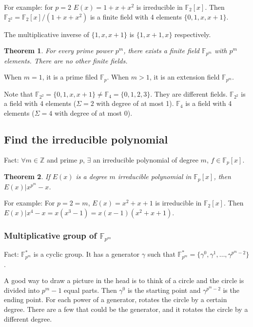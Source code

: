 \documentclass[letterpaper,12pt]{article}
\newtheorem{theorem}{Theorem}
\begin{document}
For example: for $p=2$ $E(x)=1+x+x^2$ is irreducible in $\mathbb{F}_2[x]$. Then
$\mathbb{F}_{2^2}=\mathbb{F}_2[x]/(1+x+x^2)$ is a finite field with 4 elements
$\{0,1,x,x+1\}$.

The multiplicative inverse of $\{1,x,x+1\}$ is $\{1,x+1,x\}$ respectively.

\begin{theorem}
    For every prime power $p^m$, there exists a finite field $\mathbb{F}_{p^m}$ with $p^m$ elements. There are no other finite fields.
\end{theorem}
When $m=1$, it is a prime filed $\mathbb{F}_p$. When $m>1$, it is an extension field $\mathbb{F}_{p^m}$.

Note that $\mathbb{F}_{2^2}=\{0,1,x,x+1\}\neq \mathbb{F}_4 = \{0,1,2,3\}$. They
are different fields. $\mathbb{F}_{2^2}$ is a field with 4 elements ($\Sigma =
    2$ with degree of at most 1). $\mathbb{F}_4$ is a field with 4 elements
($\Sigma = 4$ with degree of at most 0).
\subsection{Find the irreducible polynomial}
Fact: $\forall m \in \mathbb{Z}$ and prime $p$, $\exists$ an irreducible
polynomial of degree $m$, $f\in \mathbb{F}_p[x]$.
\begin{theorem}
    If $E(x)$ is a degree $m$ irreducible polynomial in $\mathbb{F}_p[x]$, then $E(x)|x^{p^m}-x$.
\end{theorem}
For example: For $p=2=m$, $E(x)=x^2+x+1$ is irreducible in $\mathbb{F}_2[x]$. Then $E(x)|x^4-x = x(x^3-1)=x(x-1)(x^2+x+1)$.

\subsubsection{Multiplicative group of $\mathbb{F}_{p^m}$}
Fact: $\mathbb{F}_{p^m}^*$ is a cyclic group. It has a generator $\gamma$ such that $\mathbb{F}_{p^m}^*=\{\gamma^0,\gamma^1,\ldots,\gamma^{p^m-2}\}$.

A good way to draw a picture in the head is to think of a circle and the circle
is divided into $p^m-1$ equal parts. Then $\gamma^0$ is the starting point and
$\gamma^{p^m-2}$ is the ending point. For each power of a generator, rotates
the circle by a certain degree. There are a few that could be the generator,
and it rotates the circle by a different degree.
\end{document}

